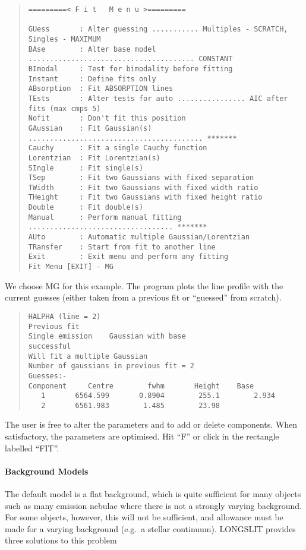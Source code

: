 \begin{quote}
\begin{small}
\begin{verbatim}
=========< F i t   M e n u >=========
 
GUess       : Alter guessing ........... Multiples - SCRATCH, Singles - MAXIMUM
BAse        : Alter base model ....................................... CONSTANT
BImodal     : Test for bimodality before fitting
Instant     : Define fits only
ABsorption  : Fit ABSORPTION lines
TEsts       : Alter tests for auto ................ AIC after fits (max cmps 5)
Nofit       : Don't fit this position
GAussian    : Fit Gaussian(s) ......................................... *******
Cauchy      : Fit a single Cauchy function
Lorentzian  : Fit Lorentzian(s)
SIngle      : Fit single(s)
TSep        : Fit two Gaussians with fixed separation
TWidth      : Fit two Gaussians with fixed width ratio
THeight     : Fit two Gaussians with fixed height ratio
Double      : Fit double(s)
Manual      : Perform manual fitting .................................. *******
AUto        : Automatic multiple Gaussian/Lorentzian
TRansfer    : Start from fit to another line
Exit        : Exit menu and perform any fitting
Fit Menu [EXIT] - MG
\end{verbatim}\end{small}\end{quote}

We choose MG for this example. The program plots the line profile with
the current guesses (either taken from a previous fit or ``guessed''
from scratch).

\begin{quote}\begin{verbatim}
HALPHA (line = 2)
Previous fit
Single emission    Gaussian with base
successful
Will fit a multiple Gaussian
Number of gaussians in previous fit = 2
Guesses:-
Component     Centre        fwhm       Height    Base
   1       6564.599       0.8904        255.1        2.934
   2       6561.983        1.485        23.98
\end{verbatim}\end{quote}

The user is free to alter the parameters and to add or delete
components. When satisfactory, the parameters are optimised. Hit ``F''
or click in the rectangle labelled ``FIT''. 

\paragraph{Background Models}

The default model is a flat background, which is quite sufficient for
many objects such as many emission nebulae where there is not a strongly
varying background.
For some objects, however, this will not be sufficient, and allowance
must be made for a varying background (e.g.\ a stellar continuum).
LONGSLIT provides three solutions to this problem

